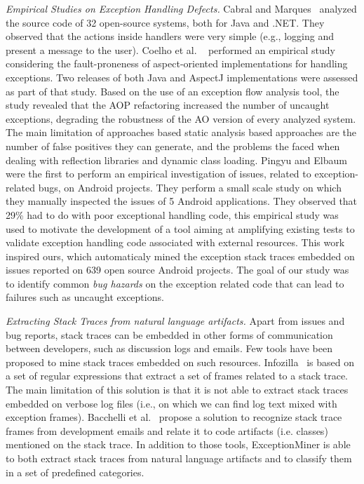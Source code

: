 \documentclass[conference]{IEEEtran}
\begin{document}
\textit{Empirical Studies on Exception Handling Defects.} 
Cabral and Marques~\cite{cabral2007exception} analyzed the
source code of 32 open-source systems, both for Java and .NET. They
observed that the actions inside handlers were very simple (e.g., logging and present a
message to the user). Coelho et al.  ~\cite{coelho2008assessing} performed an 
empirical study considering the fault-proneness of aspect-oriented implementations 
for handling exceptions. Two releases of both Java and AspectJ implementations were 
assessed as part of that study. Based on the use of an exception
flow analysis tool, the study revealed that the AOP  refactoring increased the 
number of uncaught exceptions, degrading the robustness of the AO version of every analyzed system.
The main limitation of approaches based static analysis based approaches are the number of false
positives they can generate, and the problems the faced when dealing with reflection libraries 
and dynamic class loading. Pingyu and Elbaum~\cite{Zhang12} were the first to perform
an empirical investigation of issues, related to exception-related bugs, on Android projects.  
They perform a small scale study on which they manually inspected the issues of 
5 Android applications. They observed that 29\% had to do with poor
exceptional handling code, this empirical study was used to motivate the development of a tool
aiming at amplifying existing tests to validate exception 
handling code associated with external resources. This work inspired ours,
 which automaticaly mined the exception stack traces embedded on issues 
reported on 639 open source Android projects. The goal of our study was
to identify common \emph{bug hazards} on the exception related code that can lead to 
failures such as uncaught exceptions. 

\textit{Extracting Stack Traces from natural language artifacts.} 
Apart from issues and bug reports, stack traces can be embedded in other forms of
communication between developers, such as discussion logs and emails.
Few tools have been proposed to mine stack traces embedded on such resources.
 Infozilla~\cite{bettenburg2008extracting} is based on a set of regular expressions that extract a set of frames
related to a stack trace. The main limitation of this solution is that it is not
able to extract stack traces embedded on verbose log files (i.e., on which we
can find log text mixed with exception frames). Bacchelli
et al.~\cite{bacchelli2012content} propose a solution to recognize stack trace frames
from development emails and relate it to code artifacts (i.e. classes) mentioned
on the stack trace. In addition to those tools, ExceptionMiner is able to 
both extract stack traces from natural language artifacts and to 
classify them in a set of predefined categories.
\end{document}

